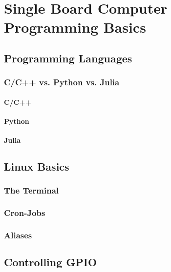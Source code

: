 \chapter{Single Board Computer Programming Basics}

\section{Programming Languages}
\subsection{C/C++ vs. Python vs. Julia}
\subsubsection{C/C++}
\subsubsection{Python}
\subsubsection{Julia}

\section{Linux Basics}
\subsection{The Terminal}
\subsection{Cron-Jobs}
\subsection{Aliases}

\section{Controlling GPIO}





